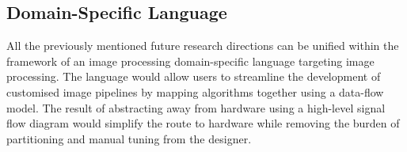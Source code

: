\subsection{Domain-Specific Language}
All the previously mentioned future research directions can be unified within the framework of an image processing domain-specific language targeting image processing. The language would allow users to streamline the development of customised image pipelines by mapping algorithms together using a data-flow model. The result of abstracting away from hardware using a high-level signal flow diagram would simplify the route to hardware while removing the burden of partitioning and manual tuning from the designer.



  
  
  

 



